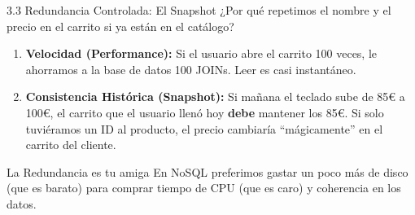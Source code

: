 \begin{frame}{3.3 Redundancia Controlada: El Snapshot}
  ¿Por qué repetimos el nombre y el precio en el carrito si ya están en el catálogo? 
  
  \begin{enumerate}
    \item \textbf{Velocidad (Performance):} Si el usuario abre el carrito 100 veces, le ahorramos a la base de datos 100 JOINs. Leer es casi instantáneo.
    \item \textbf{Consistencia Histórica (Snapshot):} Si mañana el teclado sube de 85€ a 100€, el carrito que el usuario llenó hoy \textbf{debe} mantener los 85€. Si solo tuviéramos un ID al producto, el precio cambiaría ``mágicamente'' en el carrito del cliente.
  \end{enumerate}
  
  \begin{alertblock}{La Redundancia es tu amiga}
    En NoSQL preferimos gastar un poco más de disco (que es barato) para comprar tiempo de CPU (que es caro) y coherencia en los datos.
  \end{alertblock}
\end{frame}
